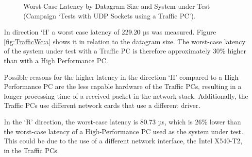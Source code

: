 \begin{figure}[h!]
  \centering
  \caption{Worst-Case Latency by Datagram Size and System under Test (Campaign `Tests with UDP Sockets using a Traffic PC').}
  \label{fig:TrafficWc}
\end{figure}

In direction `H' a worst case latency of 229.20 µs was measured. Figure \ref{fig:TrafficWc:a} shows it in relation to the datagram size. The worst-case latency of the system under test with a Traffic PC is therefore approximately 30\% higher than with a High Performance PC.

Possible reasons for the higher latency in the direction `H' compared to a High-Performance PC are the  less capable hardware of the Traffic PCs, resulting in a longer processing time of a received packet in the network stack. Additionally, the Traffic PCs use different network cards that use a different driver.

In the `R' direction, the worst-case latency is 80.73 µs, which is 26\% lower than the worst-case latency of a High-Performance PC used as the system under test. This could be due to the use of a different network interface, the Intel X540-T2, in the Traffic PCs.


